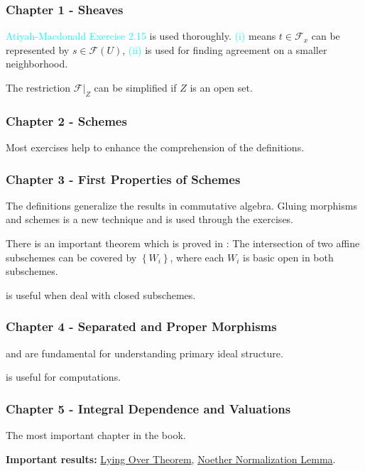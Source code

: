 \subsubsection*{Chapter 1 - Sheaves}

\textcolor{cyan}{Atiyah-Macdonald Exercise 2.15} is used thoroughly. \textcolor{cyan}{(i)} means $t\in\mathcal{F}_x$ can be represented by $s\in\mathcal{F}(U)$, \textcolor{cyan}{(ii)} is used for finding agreement on a smaller neighborhood.

The restriction $\mathcal{F}|_Z$ can be simplified if $Z$ is an open set.

\subsubsection*{Chapter 2 - Schemes}

Most exercises help to enhance the comprehension of the definitions.

\subsubsection*{Chapter 3 - First Properties of Schemes}

The definitions generalize the results in commutative algebra. Gluing morphisms and schemes is a new technique and is used through the exercises.

There is an important theorem which is proved in : The intersection of two affine subschemes can be covered by $\left\{W_i\right\}$, where each $W_i$ is basic open in both subschemes.

 is useful when deal with closed subschemes.

\subsubsection*{Chapter 4 - Separated and Proper Morphisms}

 and  are fundamental for understanding primary ideal structure.

 is useful for computations.

\subsubsection*{Chapter 5 - Integral Dependence and Valuations}

The most important chapter in the book.

\textbf{Important results:} \hyperref[5.10]{Lying Over Theorem}, \hyperref[noethernormalization]{Noether Normalization Lemma}.

